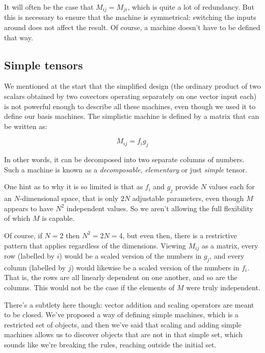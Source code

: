 It will often be the case that $M_{ij} = M_{ji}$, which is quite a lot of redundancy. But this is necessary to ensure that the machine is symmetrical: switching the inputs around does not affect the result. Of course, a machine doesn't have to be defined that way.

\subsection{Simple tensors}

We mentioned at the start that the simplified design (the ordinary product of two scalars obtained by two covectors operating separately on one vector input each) is not powerful enough to describe all these machines, even though we used it to define our basis machines. The simplistic machine is defined by a matrix that can be written as:

$$
M_{ij} = f_i g_j
$$

In other words, it can be decomposed into two separate columns of numbers. Such a machine is known as a \textit{decomposable}, \textit{elementary} or just \textit{simple} tensor.

One hint as to why it is so limited is that as $f_i$ and $g_j$ provide $N$ values each for an $N$-dimensional space, that is only $2N$ adjustable parameters, even though $M$ appears to have $N^2$ independent values. So we aren't allowing the full flexibility of which $M$ is capable.

Of course, if $N=2$ then $N^2 = 2N = 4$, but even then, there is a restrictive pattern that applies regardless of the dimensions. Viewing $M_{ij}$ as a matrix, every row (labelled by $i$) would be a scaled version of the numbers in $g_j$, and every column (labelled by $j$) would likewise be a scaled version of the numbers in $f_i$. That is, the rows are all linearly dependent on one another, and so are the columns. This would not be the case if the elements of $M$ were truly independent.

There's a subtlety here though: vector addition and scaling operators are meant to be closed. We've proposed a way of defining simple machines, which is a restricted set of objects, and then we've said that scaling and adding simple machines allows us to discover objects that are not in that simple set, which sounds like we're breaking the rules, reaching outside the initial set.

